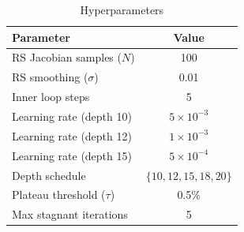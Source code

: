 \begin{table}[t]
    \caption{Hyperparameters}
    \label{tab:hyperparams}
    \centering
    \begin{tabular}{lc}
        \toprule
        Parameter & Value \\
        \midrule
        RS Jacobian samples ($N$) & 100 \\
        RS smoothing ($\sigma$) & 0.01 \\
        Inner loop steps & 5 \\
        Learning rate (depth 10) & $5 \times 10^{-3}$ \\
        Learning rate (depth 12) & $1 \times 10^{-3}$ \\
        Learning rate (depth 15) & $5 \times 10^{-4}$ \\
        Depth schedule & $\{10, 12, 15, 18, 20\}$ \\
        Plateau threshold ($\tau$) & 0.5\% \\
        Max stagnant iterations & 5 \\
        \bottomrule
    \end{tabular}
\end{table}